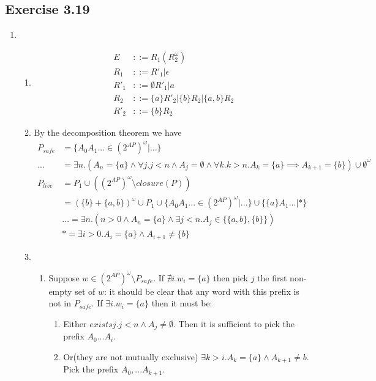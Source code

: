 \documentclass{article}
\begin{document}
	\subsection*{Exercise 3.19}
	\begin{enumerate}[label=(\alph*)]
		\item \begin{enumerate}[label=(\roman*)]
			\item
			\begin{align*}
			E 	&::= R_1(R_2^{\omega})\\
			R_1	&::= R'_1 | \epsilon\\
			R'_1 &::= \emptyset R'_1 | a\\
			R_2 &::= \{a\}R'_2 | \{b\}R_2 | \{a,b\}R_2\\
			R'_2 &::= \{b\}R_2
			\end{align*}
			\item
			By the decomposition theorem we have 
			\begin{align*}
			P_{safe}&=\{A_0A_1... \in (2^{AP})^{\omega} | ...\}\\
			...&=\exists n. (A_n =\{a\} \land \forall j. j < n \land A_j = \emptyset \land \forall k. k > n. A_k = \{a\} \implies A_{k+1} = \{b\} ) \cup \emptyset^{\omega}\\
			P_{live}&=P_1 \cup ((2^{AP})^\omega \setminus closure(P))\\
			&=(\{b\} + \{a,b\})^\omega \cup P_1 \cup \{A_0A_1... \in (2^{AP})^\omega | ...\} \cup \{\{a\}A_1... | *\}\\
			&...=\exists n.(n > 0 \land A_n = \{a\} \land \exists j < n. A_j \in \{\{a, b\}, \{b\}\} )\\
			&*=\exists i > 0. A_i = \{a\} \land A_{i+1} \neq \{b\}
			\end{align*}
			\item 
			\begin{enumerate}[label=\arabic*.]
				\item Suppose $w \in (2^{AP})^\omega \setminus P_{safe}$. If $\nexists i. w_i = \{a\}$ then pick $j$ the first non-empty set of $w$: it should be clear that any word with this prefix is not in $P_{safe}$. If $\exists i. w_i = \{a\}$ then it must be:
				\begin{enumerate}[label=\roman*.]
					\item Either $exists j. j < n \land A_j \neq \emptyset$. Then it is sufficient to pick the prefix $A_0...A_i$.
					\item Or(they are not mutually exclusive) $\exists k > i. A_{k} = \{a\} \land A_{k+1} \neq b$. Pick the prefix $A_0, ...A_{k+1}$.

\end{enumerate}
\end{enumerate}
\end{enumerate}
\end{enumerate}
\end{document}

